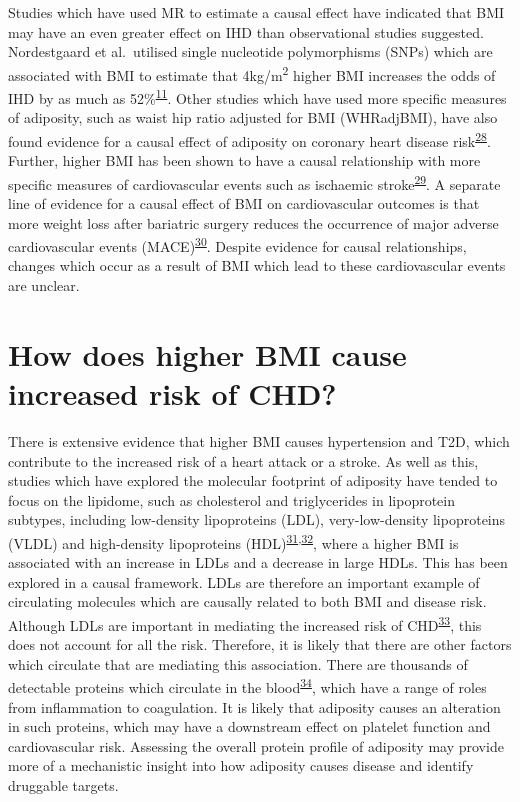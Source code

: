 \documentclass[11pt,twoside]{bristolthesis}
\begin{document}
Studies which have used MR to estimate a causal effect have indicated that BMI may have an even greater effect on IHD than observational studies suggested. Nordestgaard et al.~utilised single nucleotide polymorphisms (SNPs) which are associated with BMI to estimate that 4kg/m\textsuperscript{2} higher BMI increases the odds of IHD by as much as 52\%\textsuperscript{\protect\hyperlink{ref-Nordestgaard2012}{11}}. Other studies which have used more specific measures of adiposity, such as waist hip ratio adjusted for BMI (WHRadjBMI), have also found evidence for a causal effect of adiposity on coronary heart disease risk\textsuperscript{\protect\hyperlink{ref-Dale2017}{28}}. Further, higher BMI has been shown to have a causal relationship with more specific measures of cardiovascular events such as ischaemic stroke\textsuperscript{\protect\hyperlink{ref-Harshfield2021}{29}}. A separate line of evidence for a causal effect of BMI on cardiovascular outcomes is that more weight loss after bariatric surgery reduces the occurrence of major adverse cardiovascular events (MACE)\textsuperscript{\protect\hyperlink{ref-Jimenez2021}{30}}. Despite evidence for causal relationships, changes which occur as a result of BMI which lead to these cardiovascular events are unclear.

\hypertarget{how-does-higher-bmi-cause-increased-risk-of-chd}{%
\section{How does higher BMI cause increased risk of CHD?}\label{how-does-higher-bmi-cause-increased-risk-of-chd}}

There is extensive evidence that higher BMI causes hypertension and T2D, which contribute to the increased risk of a heart attack or a stroke. As well as this, studies which have explored the molecular footprint of adiposity have tended to focus on the lipidome, such as cholesterol and triglycerides in lipoprotein subtypes, including low-density lipoproteins (LDL), very-low-density lipoproteins (VLDL) and high-density lipoproteins (HDL)\textsuperscript{\protect\hyperlink{ref-Bell2018a}{31},\protect\hyperlink{ref-Wurtz2014}{32}}, where a higher BMI is associated with an increase in LDLs and a decrease in large HDLs. This has been explored in a causal framework. LDLs are therefore an important example of circulating molecules which are causally related to both BMI and disease risk. Although LDLs are important in mediating the increased risk of CHD\textsuperscript{\protect\hyperlink{ref-Lu2014}{33}}, this does not account for all the risk. Therefore, it is likely that there are other factors which circulate that are mediating this association. There are thousands of detectable proteins which circulate in the blood\textsuperscript{\protect\hyperlink{ref-Sun2018}{34}}, which have a range of roles from inflammation to coagulation. It is likely that adiposity causes an alteration in such proteins, which may have a downstream effect on platelet function and cardiovascular risk. Assessing the overall protein profile of adiposity may provide more of a mechanistic insight into how adiposity causes disease and identify druggable targets.
\end{document}
